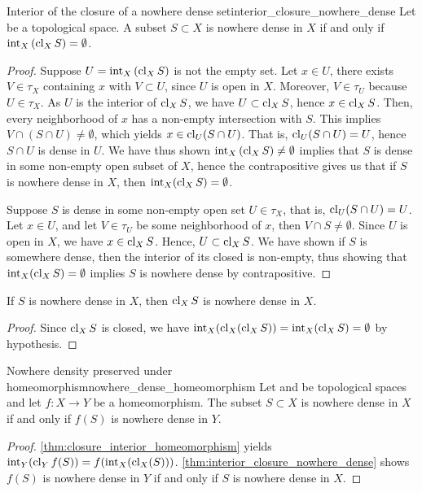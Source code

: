 \begin{theorem}{Interior of the closure of a nowhere dense set}{interior_closure_nowhere_dense}
    Let  be a topological space. A subset \(S \subset X\) is nowhere dense in \(X\) if and only if \(\operatorname{int}_X\left(\operatorname{cl}_X S\right) = \emptyset\).
\end{theorem}
\begin{proof}
    Suppose \(U = \operatorname{int}_X\left(\operatorname{cl}_X S\right)\) is not the empty set. Let \(x \in U\), there exists \(V \in \tau_X\) containing \(x\) with \(V \subset U\), since \(U\) is open in \(X\). Moreover, \(V \in \tau_U\) because \(U \in \tau_X\). As \(U\) is the interior of \(\operatorname{cl}_XS\), we have \(U \subset \operatorname{cl}_X S\), hence \(x \in \operatorname{cl}_X S\). Then, every neighborhood of \(x\) has a non-empty intersection with \(S\). This implies \(V \cap (S \cap U) \neq \emptyset\), which yields \(x \in \operatorname{cl}_U(S \cap U)\). That is, \(\operatorname{cl}_U(S\cap U) = U\), hence \(S \cap U\) is dense in \(U\). We have thus shown \(\operatorname{int}_X\left(\operatorname{cl}_X S\right) \neq \emptyset\) implies that \(S\) is dense in some non-empty open subset of \(X\), hence the contrapositive gives us that if \(S\) is nowhere dense in \(X\), then \(\operatorname{int}_X(\operatorname{cl}_XS) = \emptyset\).

    Suppose \(S\) is dense in some non-empty open set \(U \in \tau_X\), that is, \(\operatorname{cl}_U(S \cap U) = U\). Let \(x \in U\), and let \(V \in \tau_U\) be some neighborhood of \(x\), then \(V \cap S \neq \emptyset\). Since \(U\) is open in \(X\), we have \(x \in \operatorname{cl}_X S\). Hence, \(U \subset \operatorname{cl}_X S\). We have shown if \(S\) is somewhere dense, then the interior of its closed is non-empty, thus showing that \(\operatorname{int}_X (\operatorname{cl}_X S) = \emptyset\) implies \(S\) is nowhere dense by contrapositive.
\end{proof}
\begin{corollary}
    If \(S\) is nowhere dense in \(X\), then \(\operatorname{cl}_X{S}\) is nowhere dense in \(X\).
\end{corollary}
\begin{proof}
    Since \(\operatorname{cl}_XS\) is closed, we have \(\operatorname{int}_X(\operatorname{cl}_X(\operatorname{cl}_X S)) = \operatorname{int}_X(\operatorname{cl}_X S) = \emptyset\) by hypothesis.
\end{proof}

\begin{proposition}{Nowhere density preserved under homeomorphism}{nowhere_dense_homeomorphism}
    Let  and  be topological spaces and let \(f : X \to Y\) be a homeomorphism. The subset \(S\subset X\) is nowhere dense in \(X\) if and only if \(f(S)\) is nowhere dense in \(Y\).
\end{proposition}
\begin{proof}
    \cref{thm:closure_interior_homeomorphism} yields \(\operatorname{int}_Y(\operatorname{cl}_Y f(S)) = f(\operatorname{int}_X(\operatorname{cl}_X(S)))\). \cref{thm:interior_closure_nowhere_dense} shows \(f(S)\) is nowhere dense in \(Y\) if and only if \(S\) is nowhere dense in \(X\).
\end{proof}

